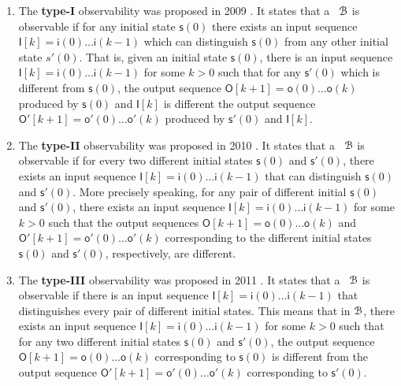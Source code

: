 \begin{enumerate}
\item The  {\bf type-I}  observability was proposed in 2009 \cite{cheng2009controllability}. It states that a \BCN\ ${\mathcal{B}}$ is observable if for any initial state   $\mathsf{s}(0)$ there exists an input sequence  $\mathsf{I}[k]=\mathsf{i}(0)\ldots\mathsf{i}(k-1)$ which can  distinguish $\mathsf{s}(0)$ from any other initial state $s'(0)$. That is,  given an initial state $\mathsf{s}(0)$, there is an input sequence $\mathsf{I}[k]=\mathsf{i}(0)\ldots\mathsf{i}(k-1)$ for some $k>0$ such that  for any  $\mathsf{s}'(0)$ which is different from $\mathsf{s}(0)$, the output sequence  $\mathsf{O}[k+1]=\mathsf{o}(0)\ldots\mathsf{o}(k)$ produced by  $\mathsf{s}(0)$ and $\mathsf{I}[k]$ is different the output sequence  $\mathsf{O}'[k+1]=\mathsf{o}'(0)\ldots \mathsf{o}'(k)$ produced by  $\mathsf{s}'(0)$ and $\mathsf{I}[k]$.

\item The  {\bf type-II} observability was proposed in 2010 \cite{Zhao2010Input}. It states that a \BCN\ ${\mathcal{B}}$ is observable if for every two different initial states $\mathsf{s}(0)$ and $\mathsf{s}'(0)$, there exists an input sequence $\mathsf{I}[k]=\mathsf{i}(0)\ldots\mathsf{i}(k-1)$ that can distinguish $\mathsf{s}(0)$ and $\mathsf{s}'(0)$. More precisely speaking,  for any pair of different initial  $\mathsf{s}(0)$ and $\mathsf{s}'(0)$, there exists an input sequence  $\mathsf{I}[k]=\mathsf{i}(0)\ldots\mathsf{i}(k-1)$ for some $k>0$ such that the output sequences $\mathsf{O}[k+1]=\mathsf{o}(0)\ldots\mathsf{o}(k)$ and  $\mathsf{O}'[k+1]=\mathsf{o}'(0)\ldots\mathsf{o}'(k)$ corresponding to  the different initial states  $\mathsf{s}(0)$ and $\mathsf{s}'(0)$, respectively, are different.
	
\item The  {\bf type-III} observability was proposed in 2011 \cite{Cheng2011Identification}.  It states that a \BCN\ ${\mathcal{B}}$ is observable if there is an input sequence $\mathsf{I}[k]=\mathsf{i}(0)\ldots\mathsf{i}(k-1)$ that distinguishes every pair of different initial states. This means that in ${\mathcal{B}}$, there exists an input sequence  $\mathsf{I}[k]=\mathsf{i}(0)\ldots\mathsf{i}(k-1)$ for some $k>0$ such that for any two different initial states $\mathsf{s}(0)$ and $\mathsf{s}'(0)$, the output sequence $\mathsf{O}[k+1]=\mathsf{o}(0)\ldots\mathsf{o}(k)$  corresponding to  $\mathsf{s}(0)$  is different from the output sequence  $\mathsf{O}'[k+1]=\mathsf{o}'(0)\ldots\mathsf{o}'(k)$ corresponding to $\mathsf{s}'(0)$.
	

\end{enumerate}
